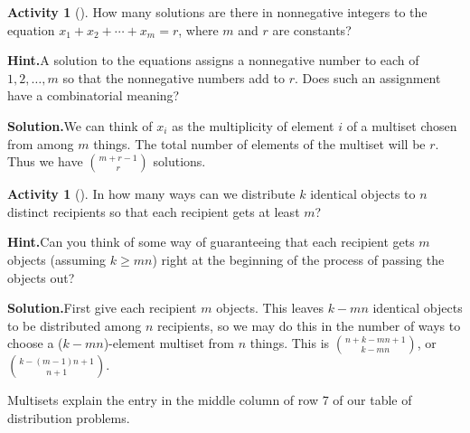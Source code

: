 \documentclass[10pt,]{book}
\theoremstyle{plain}
\theoremstyle{definition}
\newtheorem{activity}[project]{Activity}
\numberwithin{equation}{chapter}
\begin{document}
\begin{activity}[]\label{activity-117}
How many solutions are there in nonnegative integers to the equation \(x_1+x_2+ \cdots +x_m = r\), where \(m\) and \(r\) are constants?%
\par\medskip\noindent%
\textbf{Hint.}\quad A solution to the equations assigns a nonnegative number to each of \(1,2,\ldots, m\) so that the nonnegative numbers add to \(r\). Does such an assignment have a combinatorial meaning?%
\par\medskip\noindent%
\textbf{Solution.}\quad We can think of \(x_i\) as the multiplicity of element \(i\) of a multiset chosen from among \(m\) things. The total number of elements of the multiset will be \(r\). Thus we have \(\binom{m+r-1}{r}\) solutions.%
\end{activity}
\begin{activity}[]\label{activity-118}
In how many ways can we distribute \(k\) identical objects to \(n\) distinct recipients so that each recipient gets at least \(m\)?%
\par\medskip\noindent%
\textbf{Hint.}\quad Can you think of some way of guaranteeing that each recipient gets \(m\) objects (assuming \(k \ge mn\)) right at the beginning of the process of passing the objects out?%
\par\medskip\noindent%
\textbf{Solution.}\quad First give each recipient \(m\) objects.  This leaves \(k-mn\) identical objects to be distributed among \(n\) recipients, so we may do this in the number of ways to choose a (\(k-mn\))-element multiset from \(n\) things.  This is \(\binom{n+k-mn+1}{k-mn}\), or \(\binom{k-(m-1)n+1}{n+1}\).%
\end{activity}
Multisets explain the entry in the middle column of row 7 of our table of distribution problems.%
\typeout{************************************************}
\typeout{************************************************}
\end{document}
